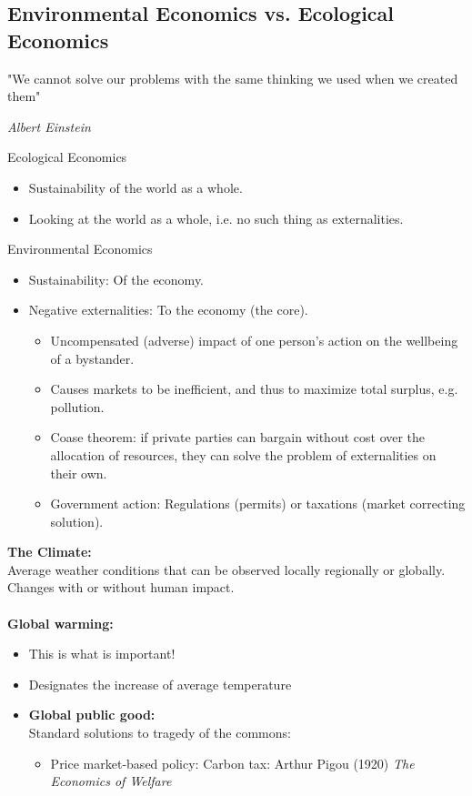 \begin{multicols}{2}
\subsection{Environmental Economics vs. Ecological Economics}
\epigraph{"We cannot solve our problems with the same thinking we used when we created them"}{\textit{Albert Einstein}}
\noindent
Ecological Economics
\begin{itemize}
  \item Sustainability of the world as a whole.
  \item Looking at the world as a whole, i.e. no such thing as externalities.
\end{itemize}
Environmental Economics
\begin{itemize}
  \item Sustainability: Of the economy.
  \item Negative externalities: To the economy (the core).
  \begin{itemize}
    \item Uncompensated (adverse) impact of one person's action on the wellbeing of a bystander.
    \item Causes markets to be inefficient, and thus to maximize total surplus, e.g. pollution.
    \item Coase theorem: if private parties can bargain without cost over the allocation of resources, they can solve the problem of externalities on their own.
    \item Government action: Regulations (permits) or taxations (market correcting solution).
  \end{itemize}
\end{itemize}
\noindent
\textbf{The Climate:}\\
Average weather conditions that can be observed locally regionally or globally. Changes with or without human impact.
\\ \\
\textbf{Global warming:}
\begin{itemize}
  \item This is what is important!
  \item Designates the increase of average temperature
  \item \textbf{Global public good:}\\
  Standard solutions to tragedy of the commons:
  \begin{itemize}
    \item Price market-based policy: Carbon tax: Arthur Pigou (1920) \textit{The Economics of Welfare}

\end{itemize}
\end{itemize}
\end{multicols}

